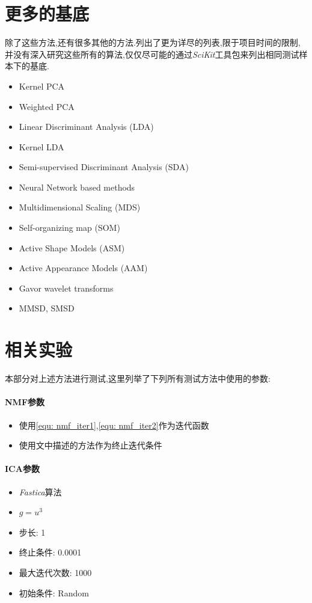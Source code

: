 \section{更多的基底}
除了这些方法,还有很多其他的方法.\cite{de2010face}列出了更为详尽的列表,限于项目时间的限制,并没有深入研究这些所有的算法,仅仅尽可能的通过\textit{SciKit}工具包来列出相同测试样本下的基底.
	\begin{itemize}
		\item Kernel PCA
		\item Weighted PCA
		\item Linear Discriminant Analysis (LDA)
		\item Kernel LDA
		\item Semi-supervised Discriminant Analysis (SDA)
		\item Neural Network based methods
		\item Multidimensional Scaling (MDS)
		\item Self-organizing map (SOM)
		\item Active Shape Models (ASM)
		\item Active Appearance Models (AAM)
		\item Gavor wavelet transforms
		\item MMSD, SMSD
	\end{itemize}

\section{相关实验}
本部分对上述方法进行测试,这里列举了下列所有测试方法中使用的参数:
	\paragraph{NMF参数}
	\begin{itemize}
		\item 使用\ref{equ: nmf_iter1},\ref{equ: nmf_iter2}作为迭代函数
		\item 使用文中描述的方法作为终止迭代条件
	\end{itemize}
	
	\paragraph{ICA参数}
	\begin{itemize}
		\item \textit{Fastica}算法
		\item $g = u^3$
		\item 步长: 1
		\item 终止条件: 0.0001
		\item 最大迭代次数: 1000
		\item 初始条件: Random
	\end{itemize}

